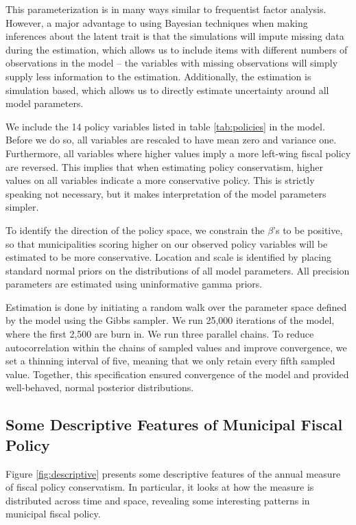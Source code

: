\documentclass[a4paper,12pt]{article}
\begin{document}
This parameterization is in many ways similar to frequentist factor analysis. However, a major advantage to using Bayesian techniques when making inferences about the latent trait is that the simulations will impute missing data during the estimation, which allows us to include items with different numbers of observations in the model -- the variables with missing observations will simply supply less information to the estimation. Additionally, the estimation is simulation based, which allows us to directly estimate uncertainty around all model parameters. 

We include the 14 policy variables listed in table  \ref{tab:policies} in the model. Before we do so, all variables are rescaled to have mean zero and variance one. Furthermore, all variables where higher values imply a more left-wing fiscal policy are reversed. This implies that when estimating policy conservatism, higher values on all variables indicate a more conservative policy. This is strictly speaking not necessary, but it makes interpretation of the model parameters simpler.

To identify the direction of the policy space, we constrain the $\beta$'s to be positive, so that municipalities scoring higher on our observed policy variables will be estimated to be more conservative. Location and scale is identified by placing standard normal priors on the distributions of all model parameters. All precision parameters are estimated using uninformative gamma priors.

Estimation is done by initiating a random walk over the parameter space defined by the model using the Gibbs sampler. We run 25,000 iterations of the model, where the first 2,500 are burn in. We run three parallel chains. To reduce autocorrelation within the chains of sampled values and improve convergence, we set a thinning interval of five, meaning that we only retain every fifth sampled value. Together, this specification ensured  convergence of the model and provided well-behaved, normal posterior distributions.

\clearpage

\subsection{Some Descriptive Features of Municipal Fiscal Policy} \label{descriptives}

Figure \ref{fig:descriptive} presents some descriptive features of the annual measure of fiscal policy conservatism. In particular, it looks at how the measure is distributed across time and space, revealing some interesting patterns in municipal fiscal policy.
\end{document}
